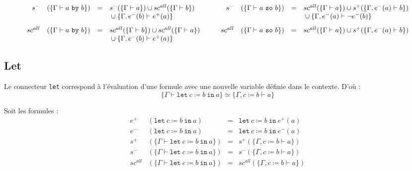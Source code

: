 \documentclass[12pt]{article}
\newcommand{\so}{~\texttt{so}~}
\newcommand{\by}{~\texttt{by}~}
\newcommand{\olet}{\texttt{let}~}
\newcommand{\oin}{~\texttt{in}~}
\begin{document}
\begin{landscape}
\[\begin{array}{rlcl c rlcl}
      s^-      & (\{\Gamma \vdash a \by b\})             & = & s^-(\{\Gamma \vdash a\}) \cup sc^{all}(\{\Gamma \vdash b\})
               & \quad                                   &
      s^-      & (\{\Gamma \vdash a \so b\})             & = & sc^{all} (\{\Gamma \vdash a \}) \cup s^+(\{\Gamma, e^-(a) \vdash b\})                          \\
               &                                         &   & {} \cup \{\Gamma, e^-(b) \vdash e^+(a)\}
               &                                         &
               &                                         &   & {} \cup \{\Gamma, e^-(a) \vdash \neg e^-(b) \}                                                 \\[.8em]

      sc^{all} & (\{\Gamma \vdash a \by b\})             & = & sc^{all}(\{\Gamma \vdash b \}) \cup sc^{all}(\{\Gamma \vdash a\})
               & \quad                                   &
      sc^{all} & (\{\Gamma \vdash a \so b\})             & = & sc^{all} (\{\Gamma \vdash a\}) \cup s^+(\{\Gamma, e^-(a) \vdash b\})                           \\
               &                                         &   & {} \cup \{\Gamma, e^-(b) \vdash e^+(a)\}
               &                                         &
               &                                         &   &
    \end{array}
  \]
\end{landscape}
\restoregeometry
\subsection*{Let}
Le connecteur \texttt{let} correspond à l'évaluation d'une formule avec une
nouvelle variable définie dans le contexte. D'où :
\[
  \{\Gamma \vdash \olet c \coloneqq b \oin a\} \simeq \{\Gamma, c \coloneqq b \vdash a \}
\]

\bigskip

Soit les formules :
\[
  \begin{array}{rlcl}
    e^+      & (\olet c \coloneqq b \oin a)                   & = & \olet c \coloneqq b \oin e^+ (a)               \\
    e^-      & (\olet c \coloneqq b \oin a)                   & = & \olet c \coloneqq b \oin e^- (a)               \\
    s^+      & (\{\Gamma \vdash \olet c \coloneqq b \oin a\}) & = & s^+ (\{\Gamma, c \coloneqq b \vdash a \})      \\
    s^-      & (\{\Gamma \vdash \olet c \coloneqq b \oin a\}) & = & s^- (\{\Gamma, c \coloneqq b \vdash a \})      \\
    sc^{all} & (\{\Gamma \vdash \olet c \coloneqq b \oin a\}) & = & sc^{all} (\{\Gamma, c \coloneqq b \vdash a \}) \\
  \end{array}
\]
\end{document}
